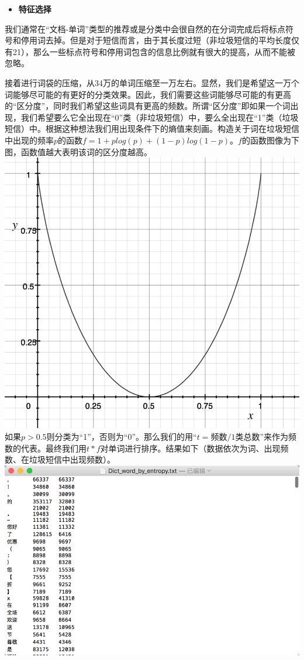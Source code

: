 \begin{itemize}
\tightlist
\item
  \textbf{特征选择}
\end{itemize}

我们通常在``文档-单词''类型的推荐或是分类中会很自然的在分词完成后将标点符号和停用词去掉。但是对于短信而言，由于其长度过短（非垃圾短信的平均长度仅有21），那么一些标点符号和停用词包含的信息比例就有很大的提高，从而不能被忽略。

接着进行词袋的压缩，从34万的单词压缩至一万左右。显然，我们是希望这一万个词能够尽可能的有更好的分类效果。因此，我们需要这些词能够尽可能的有更高的``区分度''，同时我们希望这些词具有更高的频数。所谓``区分度''即如果一个词出现，我们希望要么它全出现在``0''类（非垃圾短信）中，要么全出现在``1''类（垃圾短信）中。根据这种想法我们用出现条件下的熵值来刻画。构造关于词在垃圾短信中出现的频率\(p\)的函数\(f = 1 + p log(p) + (1 - p)log(1 - p)\)。\(f\)的函数图像为下图，函数值越大表明该词的区分度越高。
\includegraphics{./images/cjw-3.png}
如果\(p > 0.5\)则分类为``1''，否则为``0''。那么我们的用``\(t = 频数/1类总数\)''来作为频数的代表。最终我们用\(t*f\)对单词进行排序。结果如下（数据依次为词、出现频数、在垃圾短信中出现频数）。
\includegraphics{./images/cjw-4.png}

